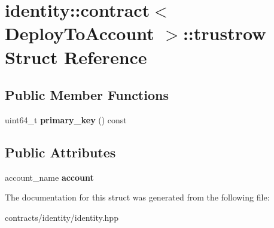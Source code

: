 \hypertarget{structidentity_1_1contract_1_1trustrow}{}\section{identity\+:\+:contract$<$ Deploy\+To\+Account $>$\+:\+:trustrow Struct Reference}
\label{structidentity_1_1contract_1_1trustrow}
\subsection*{Public Member Functions}
\begin{DoxyCompactItemize}
\item 
\mbox{\label{structidentity_1_1contract_1_1trustrow_a45bf8950f44137814130c2791c9cec94}} 
uint64\+\_\+t {\bfseries primary\+\_\+key} () const
\end{DoxyCompactItemize}
\subsection*{Public Attributes}
\begin{DoxyCompactItemize}
\item 
\mbox{\label{structidentity_1_1contract_1_1trustrow_a29f80401863fd8aa76ea67cb80d20393}} 
account\+\_\+name {\bfseries account}
\end{DoxyCompactItemize}


The documentation for this struct was generated from the following file\+:\begin{DoxyCompactItemize}
\item 
contracts/identity/identity.\+hpp\end{DoxyCompactItemize}
